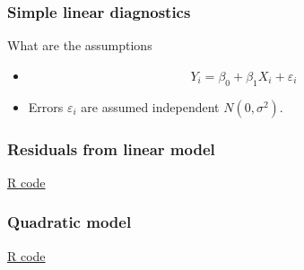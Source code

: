 \documentclass[handout]{beamer}
\begin{document}
   \begin{frame} \frametitle{Simple linear diagnostics}

   \begin{block}
   {What are the assumptions}
   \begin{itemize}
   \item $$
   Y_i = \beta_0 + \beta_1 X_{i} + \varepsilon_i
   $$
   \item Errors $\varepsilon_i$ are assumed independent $N(0,\sigma^2)$.
   \end{itemize}

   \end{block}
   \end{frame}



   \begin{frame}
   \frametitle{Residuals from linear model}
   \begin{center}
   \end{center}
   \href{http://stats191.stanford.edu/simple_diagnostics.html#poorly-fitting-linear-model}{R code}
   \end{frame}



   \begin{frame}
   \frametitle{Quadratic model}
   \begin{center}
   \end{center}
   \href{http://stats191.stanford.edu/simple_diagnostics.html#poorly-fitting-linear-model}{R code}
   \end{frame}

\end{document}
